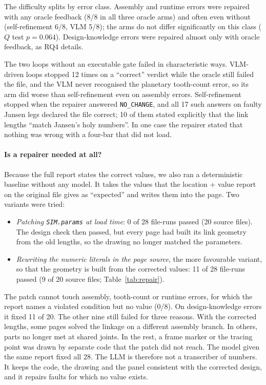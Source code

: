 The difficulty splits by error class. Assembly and runtime errors were repaired with any oracle feedback (8/8 in all three oracle arms) and often even without (self-refinement 6/8, VLM 5/8); the arms do not differ significantly on this class ($Q$ test $p=0.064$). Design-knowledge errors were repaired almost only with oracle feedback, as RQ4 details.

The two loops without an executable gate failed in characteristic ways. VLM-driven loops stopped 12 times on a ``correct'' verdict while the oracle still failed the file, and the VLM never recognised the planetary tooth-count error, so its arm did worse than self-refinement even on assembly errors. Self-refinement stopped when the repairer answered \texttt{NO\_CHANGE}, and all 17 such answers on faulty Jansen legs declared the file correct; 10 of them stated explicitly that the link lengths ``match Jansen's holy numbers''. In one case the repairer stated that nothing was wrong with a four-bar that did not load.

\paragraph{Is a repairer needed at all?} Because the full report states the correct values, we also ran a deterministic baseline without any model. It takes the values that the location + value report on the original file gives as ``expected'' and writes them into the page. Two variants were tried:
\begin{itemize}
\item \emph{Patching \texttt{SIM.params} at load time}: 0 of 28 file-runs passed (20 source files). The design check then passed, but every page had built its link geometry from the old lengths, so the drawing no longer matched the parameters.
\item \emph{Rewriting the numeric literals in the page source}, the more favourable variant, so that the geometry is built from the corrected values: 11 of 28 file-runs passed (9 of 20 source files; Table~\ref{tab:repair}).
\end{itemize}
The patch cannot touch assembly, tooth-count or runtime errors, for which the report names a violated condition but no value (0/8). On design-knowledge errors it fixed 11 of 20. The other nine still failed for three reasons. With the corrected lengths, some pages solved the linkage on a different assembly branch. In others, parts no longer met at shared joints. In the rest, a frame marker or the tracing point was drawn by separate code that the patch did not reach. The model given the same report fixed all 28. The LLM is therefore not a transcriber of numbers. It keeps the code, the drawing and the panel consistent with the corrected design, and it repairs faults for which no value exists.

